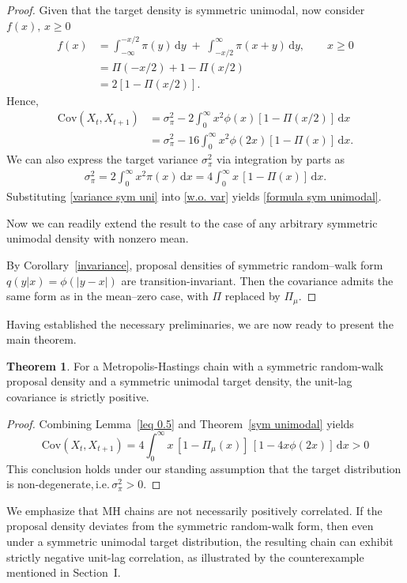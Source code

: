 \documentclass[conference]{IEEEtran}
\newcommand{\df}{\mathrm{d}}
\theoremstyle{definition}
\newtheorem{theorem}{Theorem}[section]
\begin{document}
\begin{proof}
Given that the target density is symmetric unimodal, now consider \(f(x),\,x\geq 0\)
\begin{align*}
f(x) 
&= \int_{-\infty}^{-x/2} \pi(y)\,\df y \;+\; \int_{-x/2}^{\infty} \pi(x+y)\,\df y, \qquad x\ge 0 \nonumber\\
&= \Pi(-x/2)+1-\Pi(x/2)\nonumber\\
&= 2[1-\Pi(x/2)].
\end{align*}
Hence,
\begin{align}
\mathrm{Cov}(X_t,X_{t+1})\nonumber
&=\sigma_{\pi}^2\label{w.o. var}
-2\int_0^\infty x^2 \phi(x)[1-\Pi(x/2)]\,\df x\nonumber\\
&=\sigma_{\pi}^2
-16\int_0^\infty x^2 \phi(2x)[1-\Pi(x)]\,\df x.
\end{align}
We can also express the target variance $\sigma_{\pi}^2$ via integration by parts as
\begin{align}\label{variance sym uni}
\sigma_{\pi}^2= 2\int_0^\infty x^2 \pi(x)\,\df x
= 4\int_0^\infty x\,[1-\Pi(x)]\,\df x.
\end{align}
Substituting \eqref{variance sym uni} into \eqref{w.o. var} yields \eqref{formula sym unimodal}.

Now we can readily extend the result to the case of any arbitrary symmetric unimodal density with nonzero mean.

By Corollary~\ref{invariance}, proposal densities of symmetric random–walk form \(q(y|x)=\phi(|y-x|)\) are transition-invariant. Then the covariance admits the same form as in the mean–zero case, with \(\Pi\) replaced by \(\Pi_\mu\).
\end{proof}

Having established the necessary preliminaries, we are now ready to present the main theorem.

\begin{theorem}\label{main theorem}
For a Metropolis-Hastings chain with a symmetric random-walk proposal density 
and a symmetric unimodal target density, the unit-lag covariance is strictly positive.
\end{theorem}
\begin{proof}
Combining Lemma~\ref{leq 0.5} and Theorem~\ref{sym unimodal} yields
\[
\mathrm{Cov}(X_t,X_{t+1})
= 4 \int_0^\infty x \,[1-\Pi_\mu(x)]\,[1-4x\phi(2x)]\,\df x>0
\]
This conclusion holds under our standing assumption that the target distribution is non-degenerate,\,i.e.\,\(\sigma_{\pi}^2>0\).
\end{proof}
We emphasize that MH chains are not necessarily positively correlated. 
If the proposal density deviates from the symmetric random-walk form, 
then even under a symmetric unimodal target distribution, 
the resulting chain can exhibit strictly negative unit-lag correlation, 
as illustrated by the counterexample mentioned in Section~I.
\end{document}
